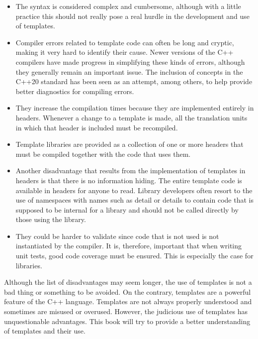 \begin{itemize}
\item
The syntax is considered complex and cumbersome, although with a little practice this should not really pose a real hurdle in the development and use of templates.

\item
Compiler errors related to template code can often be long and cryptic, making it very hard to identify their cause. Newer versions of the C++ compilers have made progress in simplifying these kinds of errors, although they generally remain an important issue. The inclusion of concepts in the C++20 standard has been seen as an attempt, among others, to help provide better diagnostics for compiling errors.

\item
They increase the compilation times because they are implemented entirely in headers. Whenever a change to a template is made, all the translation units in which that header is included must be recompiled.

\item
Template libraries are provided as a collection of one or more headers that must be compiled together with the code that uses them.

\item
Another disadvantage that results from the implementation of templates in headers is that there is no information hiding. The entire template code is available in headers for anyone to read. Library developers often resort to the use of namespaces with names such as detail or details to contain code that is supposed to be internal for a library and should not be called directly by those using the library.

\item
They could be harder to validate since code that is not used is not instantiated by the compiler. It is, therefore, important that when writing unit tests, good code coverage must be ensured. This is especially the case for libraries.
\end{itemize}

Although the list of disadvantages may seem longer, the use of templates is not a bad thing or something to be avoided. On the contrary, templates are a powerful feature of the C++ language. Templates are not always properly understood and sometimes are misused or overused. However, the judicious use of templates has unquestionable advantages. This book will try to provide a better understanding of templates and their use.







